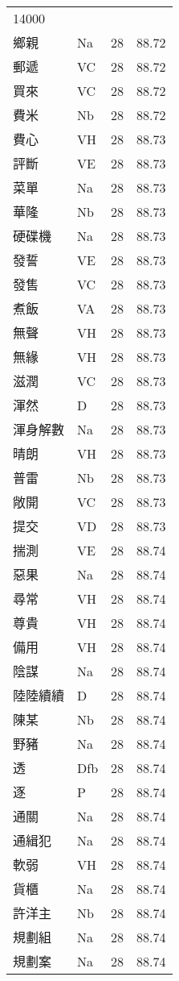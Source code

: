 \documentclass[twocolumn]{book}
\begin{document}
\begin{supertabular}{llrr}
14000\\
鄉親 & Na & 28 &  88.72\\
郵遞 & VC & 28 &  88.72\\
買來 & VC & 28 &  88.72\\
費米 & Nb & 28 &  88.72\\
費心 & VH & 28 &  88.73\\
評斷 & VE & 28 &  88.73\\
菜單 & Na & 28 &  88.73\\
華隆 & Nb & 28 &  88.73\\
硬碟機 & Na & 28 &  88.73\\
發誓 & VE & 28 &  88.73\\
發售 & VC & 28 &  88.73\\
煮飯 & VA & 28 &  88.73\\
無聲 & VH & 28 &  88.73\\
無緣 & VH & 28 &  88.73\\
滋潤 & VC & 28 &  88.73\\
渾然 & D & 28 &  88.73\\
渾身解數 & Na & 28 &  88.73\\
晴朗 & VH & 28 &  88.73\\
普雷 & Nb & 28 &  88.73\\
敞開 & VC & 28 &  88.73\\
提交 & VD & 28 &  88.73\\
揣測 & VE & 28 &  88.74\\
惡果 & Na & 28 &  88.74\\
尋常 & VH & 28 &  88.74\\
尊貴 & VH & 28 &  88.74\\
備用 & VH & 28 &  88.74\\
陰謀 & Na & 28 &  88.74\\
陸陸續續 & D & 28 &  88.74\\
陳某 & Nb & 28 &  88.74\\
野豬 & Na & 28 &  88.74\\
透 & Dfb & 28 &  88.74\\
逐 & P & 28 &  88.74\\
通關 & Na & 28 &  88.74\\
通緝犯 & Na & 28 &  88.74\\
軟弱 & VH & 28 &  88.74\\
貨櫃 & Na & 28 &  88.74\\
許洋主 & Nb & 28 &  88.74\\
規劃組 & Na & 28 &  88.74\\
規劃案 & Na & 28 &  88.74\\

\end{supertabular}
\end{document}
